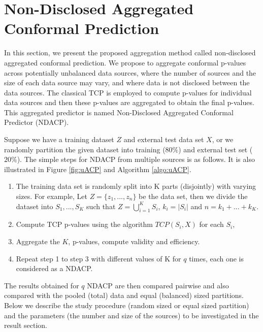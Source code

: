 \documentclass[main]{subfiles}
\begin{document}
\section{Non-Disclosed Aggregated Conformal Prediction}
In this section, we present the proposed aggregation method called non-disclosed aggregated conformal prediction. We propose to aggregate conformal p-values across potentially unbalanced data sources, where the number of sources and the size of each data source may vary, and where data is not disclosed between the data sources. The classical TCP is employed to compute p-values for individual data sources and then these p-values are aggregated to obtain the final p-values. This aggregated predictor is named Non-Disclosed Aggregated Conformal Predictor (NDACP). 

Suppose we have a training dataset $Z$ and  external test data set $X$, or we randomly partition the given dataset into training ($80\%$) and external test set ($20\%$). The simple steps for NDACP from multiple sources is as follows. It is also illustrated in Figure \ref{fig:uACP} and Algorithm \ref{algo:uACP}.
\begin{enumerate}

\item The training data set is randomly split into K parts (disjointly) with varying sizes. For example, Let $Z = \{ z_1 , ..., z_n \} $ be the data set, then we divide the dataset into $S_1, ..., S_K$ such that $Z = \bigcup_{i=1}^K S_i$, $k_i = |S_i|$ and $n = k_1+ ...+k_K$.

\item Compute TCP p-values using the algorithm $TCP(S_i, X)$ for each $S_i$, 

\item Aggregate the $K$, p-values, compute validity and efficiency.  

\item Repeat step 1 to step 3 with different values of K for $q$ times, each one is considered as a NDACP. %


\end{enumerate}

The results obtained for $q$ NDACP are then compared pairwise and also compared with the pooled (total) data and equal (balanced) sized partitions. Below we describe the study procedure (random sized or equal sized partition) and the parameters (the number and size of the sources) to be investigated in the result section. 
\end{document}
